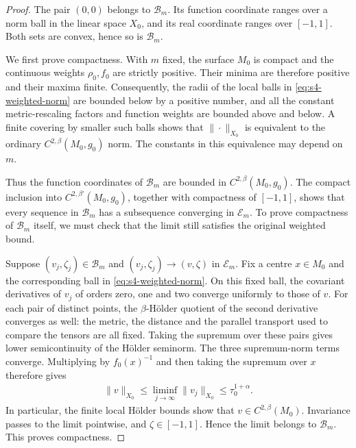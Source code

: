 \documentclass[a4paper,11pt,oneside,reqno]{amsart}
\numberwithin{equation}{section}
\theoremstyle{definition}
\begin{document}
\begin{proof}
    The pair $(0,0)$ belongs to $\mathcal B_m$. Its function
    coordinate ranges over a norm ball in the linear space
    $X_0$, and its real coordinate ranges over $[-1,1]$.
    Both sets are convex, hence so is $\mathcal B_m$.

    We first prove compactness. With $m$ fixed, the surface
    $M_0$ is compact and the continuous weights $\rho_0,f_0$
    are strictly positive. Their minima are therefore
    positive and their maxima finite. Consequently, the
    radii of the local balls in \eqref{eq:s4-weighted-norm}
    are bounded below by a positive number, and all the
    constant metric-rescaling factors and function weights
    are bounded above and below. A finite covering by smaller
    such balls shows that $\|\cdot\|_{X_0}$ is equivalent
    to the ordinary $C^{2,\beta}(M_0,g_0)$ norm. The constants
    in this equivalence may depend on $m$.

    Thus the function coordinates of $\mathcal B_m$ are
    bounded in $C^{2,\beta}(M_0,g_0)$. The compact inclusion
    into $C^{2,\beta'}(M_0,g_0)$, together with compactness
    of $[-1,1]$, shows that every sequence in $\mathcal B_m$
    has a subsequence converging in $\mathcal E_m$. To prove
    compactness of $\mathcal B_m$ itself, we must check that
    the limit still satisfies the original weighted bound.

    Suppose $(v_j,\zeta_j)\in\mathcal B_m$ and
    $(v_j,\zeta_j)\to(v,\zeta)$ in $\mathcal E_m$.
    Fix a centre $x\in M_0$ and the corresponding ball in
    \eqref{eq:s4-weighted-norm}. On this fixed ball, the
    covariant derivatives of $v_j$ of orders zero, one and
    two converge uniformly to those of $v$. For each pair
    of distinct points, the $\beta$-H\"older quotient of the
    second derivative converges as well: the metric, the
    distance and the parallel transport used to compare the
    tensors are all fixed. Taking the supremum over these
    pairs gives lower semicontinuity of the H\"older
    seminorm. The three supremum-norm terms converge.
    Multiplying by $f_0(x)^{-1}$ and then taking the supremum
    over $x$ therefore gives
    \begin{align*}
        \|v\|_{X_0}
        \leq\liminf_{j\to\infty}\|v_j\|_{X_0}
        \leq\tau_0^{1+\alpha}.
    \end{align*}
    In particular, the finite local H\"older bounds show that
    $v\in C^{2,\beta}(M_0)$. Invariance passes to the limit
    pointwise, and $\zeta\in[-1,1]$. Hence the limit belongs
    to $\mathcal B_m$. This proves compactness.


\end{proof}
\end{document}

